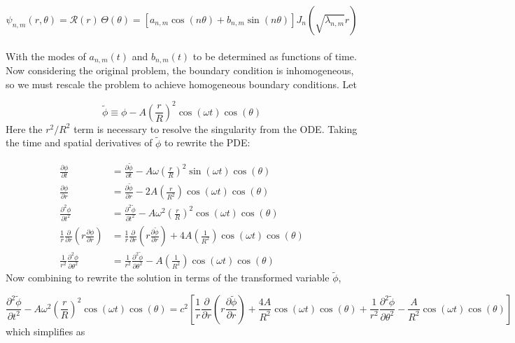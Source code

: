 \documentclass{homework}
\begin{document}
\[ \psi_{n,m} (r, \theta) = \mathcal{R}(r) \, \Theta(\theta) = [a_{n,m} \cos(n \theta) + b_{n,m} \sin(n \theta)] J_n (\sqrt{\lambda_{n,m}} r) \]
\\ \noindent
With the modes of $a_{n,m}(t)$ and $b_{n,m}(t)$ to be determined as functions of time. Now considering the original problem, the boundary condition is inhomogeneous, so we must rescale the problem to achieve homogeneous boundary conditions. Let

\[ \tilde{\phi} \equiv \phi - A \left(\frac{r}{R} \right)^2 \cos(\omega t) \cos(\theta) \]
\noindent
Here the $r^2 / R^2$ term is necessary to resolve the singularity from the ODE. Taking the time and spatial derivatives of $\tilde{\phi}$ to rewrite the PDE:

\begin{align*}
\frac{ \partial \phi}{\partial t} &= \frac{ \partial \tilde{\phi}}{\partial t} - A \omega \left(\frac{r}{R} \right)^2 \sin(\omega t) \cos(\theta) \\
\frac{ \partial \phi}{\partial r} &= \frac{ \partial \tilde{\phi}}{\partial r} - 2 A \left(\frac{r}{R^2}\right) \cos(\omega t) \cos(\theta) \\
\frac{ \partial^2 \phi}{\partial t^2} &= \frac{ \partial^2 \tilde{\phi}}{\partial t^2} - A \omega^2 \left(\frac{r}{R} \right)^2 \cos(\omega t) \cos(\theta) \\
\frac{1}{r} \frac{\partial}{\partial r} (r \frac{\partial \phi}{\partial r}) &= \frac{1}{r} \frac{\partial}{\partial r} (r \frac{\partial \tilde{\phi}}{\partial r}) + 4 A \left(\frac{1}{R^2}\right) \cos(\omega t) \cos(\theta) \\
\frac{1}{r^2} \frac{\partial^2 \phi }{\partial \theta^2} &= \frac{1}{r^2} \frac{\partial^2 \tilde{\phi} }{\partial \theta^2} - A \left(\frac{1}{R^2}\right) \cos(\omega t) \cos(\theta)
\end{align*}
\noindent
Now combining to rewrite the solution in terms of the transformed variable $\tilde{\phi}$,

\[ \frac{ \partial^2 \tilde{\phi}}{\partial t^2} - A \omega^2 \left(\frac{r}{R} \right)^2 \cos(\omega t) \cos(\theta) = c^2 \left[ \frac{1}{r} \frac{\partial}{\partial r} (r \frac{\partial \tilde{\phi}}{\partial r}) + \frac{4A}{R^2} \cos(\omega t) \cos(\theta) + \frac{1}{r^2} \frac{\partial^2 \tilde{\phi} }{\partial \theta^2} - \frac{A}{R^2} \cos(\omega t) \cos(\theta) \right]\]
\noindent
which simplifies as
\end{document}
